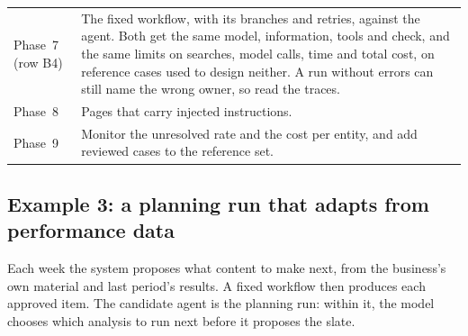 \documentclass[10pt]{article}
\begin{document}
\begin{center}
\begin{tabularx}{\linewidth}{@{}p{2.7cm} L@{}}
Phase~7 (row B4) & The fixed workflow, with its branches and retries, against the agent. Both get the same model, information, tools and check, and the same limits on searches, model calls, time and total cost, on reference cases used to design neither. A run without errors can still name the wrong owner, so read the traces. \\
Phase~8 & Pages that carry injected instructions. \\
Phase~9 & Monitor the unresolved rate and the cost per entity, and add reviewed cases to the reference set. \\
\bottomrule
\end{tabularx}
\end{center}

\clearpage
\subsection*{Example 3: a planning run that adapts from performance data}

Each week the system proposes what content to make next, from the business's own material and last period's results. A fixed workflow then produces each approved item. The candidate agent is the planning run: within it, the model chooses which analysis to run next before it proposes the slate.
\end{document}
